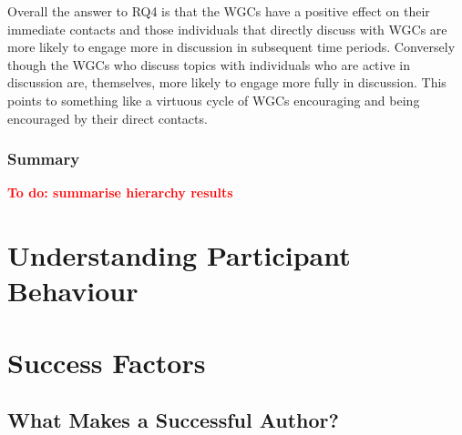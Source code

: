 \documentclass[twocolumn,10pt]{article}
\newcommand{\todo}[1]{\textbf{\textcolor{red}{To do: #1}}}
\begin{document}
Overall the answer to RQ4 is that the WGCs have a positive effect on their
immediate contacts and those individuals that directly discuss with WGCs
are more likely to engage more in discussion in subsequent time periods.
Conversely though the WGCs who discuss topics with individuals who are
active in discussion are, themselves, more likely to engage more fully in
discussion. This points to something like a virtuous cycle of WGCs
encouraging and being encouraged by their direct contacts. 

\subsubsection{Summary}


\todo{summarise hierarchy results}

\section{Understanding Participant Behaviour}






\section{Success Factors}

\subsection{What Makes a Successful Author?}
\end{document}
